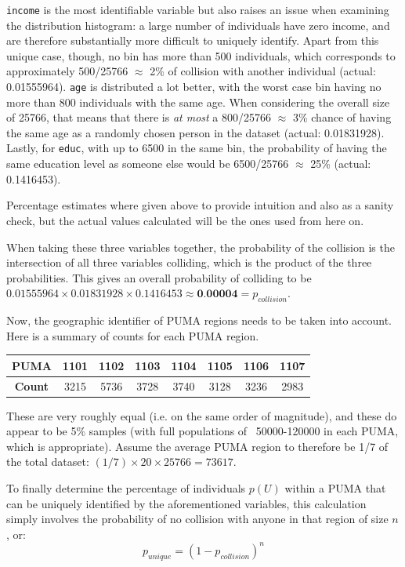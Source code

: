 \documentclass[12pt]{article}
\begin{document}
\texttt{income} is the most identifiable variable but also raises an issue when examining the distribution histogram: a large number of individuals have zero income, and are therefore substantially more difficult to uniquely identify. Apart from this unique case, though, no bin has more than 500 individuals, which corresponds to approximately 500/25766 $\approx$ 2\% of collision with another individual (actual: {0.01555964}). \texttt{age} is distributed a lot better, with the worst case bin having no more than 800 individuals with the same age. When considering the overall size of 25766, that means that there is \emph{at most} a 800/25766 $\approx$ 3\% chance of having the same age as a randomly chosen person in the dataset (actual: {0.01831928}). Lastly, for \texttt{educ}, with up to 6500 in the same bin, the probability of having the same education level as someone else would be 6500/25766 $\approx$ 25\% (actual: {0.1416453}).

Percentage estimates where given above to provide intuition and also as a sanity check, but the actual values calculated will be the ones used from here on.

When taking these three variables together, the probability of the collision is the intersection of all three variables colliding, which is the product of the three probabilities. This gives an overall probability of colliding to be $0.01555964 \times 0.01831928 \times 0.1416453 \approx \textbf{0.00004} = p_{collision}$.

Now, the geographic identifier of PUMA regions needs to be taken into account. Here is a summary of counts for each PUMA region.
\begin{center}
\begin{tabular}{|c|ccccccc|}
\hline
\textbf{PUMA} & 1101 & 1102 & 1103 & 1104 & 1105 & 1106 & 1107\\\hline
\textbf{Count} & 3215 & 5736 & 3728 & 3740 & 3128 & 3236 & 2983\\ \hline
\end{tabular}
\end{center}
These are very roughly equal (i.e. on the same order of magnitude), and these do appear to be 5\% samples (with full populations of ~50000-120000 in each PUMA, which is appropriate). Assume the average PUMA region to therefore be 1/7 of the total dataset: $(1/7) \times 20 \times 25766 = 73617$.

To finally determine the percentage of individuals $p(U)$ within a PUMA that can be uniquely identified by the aforementioned variables, this calculation simply involves the probability of no collision with anyone in that region of size $n$, or:
\[p_{unique} = (1-p_{collision})^{n}\]
\end{document}
